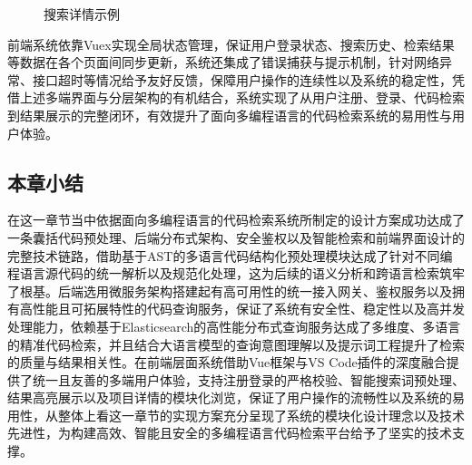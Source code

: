 \documentclass[UTF8,a4paper,12pt]{ctexart}
\numberwithin{equation}{section}
\begin{document}
\begin{figure}[H]
	\caption{搜索详情示例}
	\label{repodetailpage}
\end{figure}
前端系统依靠Vuex实现全局状态管理，保证用户登录状态、搜索历史、检索结果等数据在各个页面间同步更新，系统还集成了错误捕获与提示机制，针对网络异常、接口超时等情况给予友好反馈，保障用户操作的连续性以及系统的稳定性，凭借上述多端界面与分层架构的有机结合，系统实现了从用户注册、登录、代码检索到结果展示的完整闭环，有效提升了面向多编程语言的代码检索系统的易用性与用户体验。\par
\subsection{本章小结}
在这一章节当中依据面向多编程语言的代码检索系统所制定的设计方案成功达成了一条囊括代码预处理、后端分布式架构、安全鉴权以及智能检索和前端界面设计的完整技术链路，借助基于AST的多语言代码结构化预处理模块达成了针对不同编程语言源代码的统一解析以及规范化处理，这为后续的语义分析和跨语言检索筑牢了根基。后端选用微服务架构搭建起有高可用性的统一接入网关、鉴权服务以及拥有高性能且可拓展特性的代码查询服务，保证了系统有安全性、稳定性以及高并发处理能力，依赖基于Elasticsearch的高性能分布式查询服务达成了多维度、多语言的精准代码检索，并且结合大语言模型的查询意图理解以及提示词工程提升了检索的质量与结果相关性。在前端层面系统借助Vue框架与VS Code插件的深度融合提供了统一且友善的多端用户体验，支持注册登录的严格校验、智能搜索词预处理、结果高亮展示以及项目详情的模块化浏览，保证了用户操作的流畅性以及系统的易用性，从整体上看这一章节的实现方案充分呈现了系统的模块化设计理念以及技术先进性，为构建高效、智能且安全的多编程语言代码检索平台给予了坚实的技术支撑。\par
\newpage
{}
\end{document}

